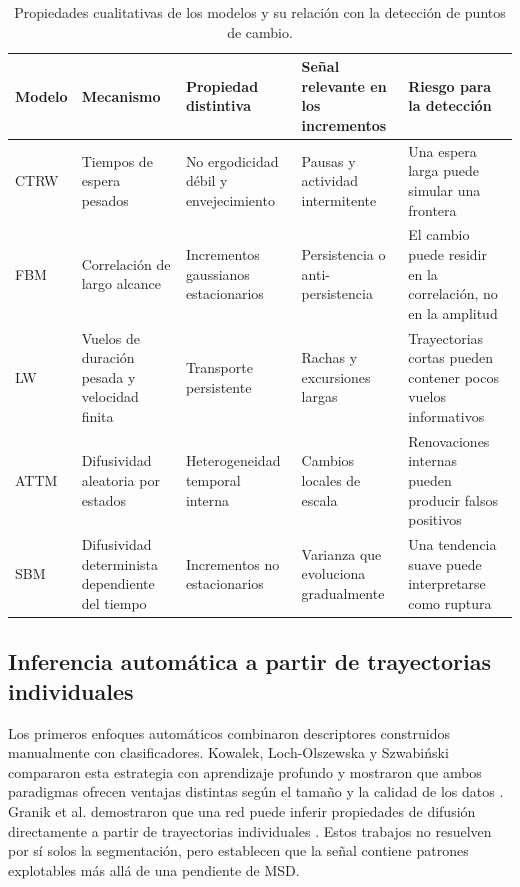 \documentclass[a4paper,12pt]{article}
\begin{document}
\begin{table}[htbp]
\centering
\scriptsize
\setlength{\tabcolsep}{2pt}
\begin{tabularx}{0.99\textwidth}{>{\RaggedRight\arraybackslash}p{1.15cm}>{\RaggedRight\arraybackslash}p{2.25cm}>{\RaggedRight\arraybackslash}p{1.95cm}YY}
\toprule
\textbf{Modelo} & \textbf{Mecanismo} & \textbf{Propiedad distintiva} & \textbf{Señal relevante en los incrementos} & \textbf{Riesgo para la detección} \\
\midrule
CTRW & Tiempos de espera pesados & No ergodicidad débil y envejecimiento & Pausas y actividad intermitente & Una espera larga puede simular una frontera \\
FBM & Correlación de largo alcance & Incrementos gaussianos estacionarios & Persistencia o anti-persistencia & El cambio puede residir en la correlación, no en la amplitud \\
LW & Vuelos de duración pesada y velocidad finita & Transporte persistente & Rachas y excursiones largas & Trayectorias cortas pueden contener pocos vuelos informativos \\
ATTM & Difusividad aleatoria por estados & Hetero\-geneidad temporal interna & Cambios locales de escala & Renovaciones internas pueden producir falsos positivos \\
SBM & Difusividad determinista dependiente del tiempo & Incrementos no estacionarios & Varianza que evoluciona gradualmente & Una tendencia suave puede interpretarse como ruptura \\
\bottomrule
\end{tabularx}
\caption{Propiedades cualitativas de los modelos y su relación con la detección de puntos de cambio.}
\label{tab:model-properties}
\end{table}

\subsection{Inferencia automática a partir de trayectorias individuales}

Los primeros enfoques automáticos combinaron descriptores construidos manualmente con clasificadores. Kowalek, Loch-Olszewska y Szwabi{\'n}ski compararon esta estrategia con aprendizaje profundo y mostraron que ambos paradigmas ofrecen ventajas distintas según el tamaño y la calidad de los datos \cite{kowalek2019classification}. Granik et al. demostraron que una red puede inferir propiedades de difusión directamente a partir de trayectorias individuales \cite{granik2019single}. Estos trabajos no resuelven por sí solos la segmentación, pero establecen que la señal contiene patrones explotables más allá de una pendiente de MSD.
\end{document}
